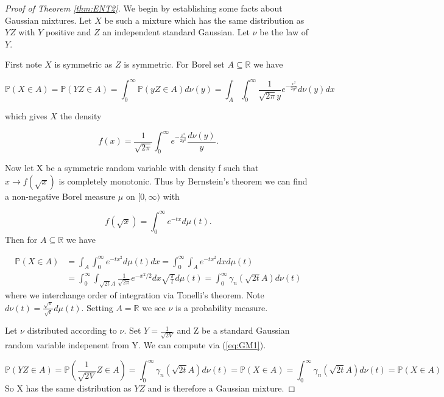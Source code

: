 \documentclass[10pt]{article}
\newcommand{\Pp}{\mathbb{P}}
\newcommand{\1}{\textbf{1}}
\newcommand{\R}{\mathbb{R}}
\theoremstyle{remark}
\theoremstyle{definition}
\begin{document}
\begin{proof}[Proof of Theorem \ref{thm:ENT2}]

We begin by establishing some facts about Gaussian mixtures. Let $X$ be such a mixture which has the same distribution as $YZ$ with $Y$ positive and $Z$ an independent standard Gaussian. Let $\nu$ be the law of $Y$. 

First note $X$ is symmetric as $Z$ is symmetric. For Borel set $A \subseteq \R$ we have

\begin{equation}\label{eq:test}
	\Pp(X \in A) = \Pp(YZ \in A) = \int_0^{\infty}\Pp(yZ \in A)d\nu(y) = \int_A \int_0^{\infty}\frac{1}{\sqrt{2\pi}y}e^{-\frac{x^2}{2y^2}}d\nu(y)dx
\end{equation}

which gives $X$ the density

\begin{equation}\label{eq:GM2}
	f(x) = \frac{1}{\sqrt{2\pi}}\int_0^{\infty}e^{-\frac{x^2}{2y^2}}\frac{d\nu(y)}{y}.
\end{equation}

Now let X be a symmetric random variable with density f such that $x \to f(\sqrt{x})$ is completely monotonic. Thus by Bernstein's theorem we can find a non-negative Borel measure $\mu$ on $[0,\infty)$ with

\begin{equation}
	f(\sqrt{x}) = \int_0^{\infty}e^{-tx}d\mu(t).
\end{equation} Then for $A \subseteq \R$ we have

\begin{align}\label{eq:GM1}
	\Pp(X \in A) &= \int_A \int_0^{\infty} e^{-tx^2}d\mu(t)dx = \int_0^{\infty}\int_A e^{-tx^2}dxd\mu(t)\\
	&= \int_0^{\infty} \int_{\sqrt{2t}A} \frac{1}{\sqrt{2\pi}} e^{-x^2/2}dx\sqrt{\frac{\pi}{t}}d\mu(t) = \int_0^{\infty} \gamma_n(\sqrt{2t}A)d\nu(t)
\end{align} where we interchange order of integration via Tonelli's theorem. Note $d\nu(t) = \frac{\sqrt{\pi}}{\sqrt{t}} d\mu(t)$. Setting $A = \R$ we see $\nu$ is a probability measure.

Let $\nu$ distributed according to $\nu$. Set $Y = \frac{1}{\sqrt{2V}}$ and Z be a standard Gaussian random variable indepenent from Y. We can compute via (\ref{eq:GM1}). 

\begin{equation*}
	\Pp(YZ \in A) = \Pp(\frac{1}{\sqrt{2V}}Z \in A) = \int_0^{\infty} \gamma_n(\sqrt{2t}A) d\nu(t) = \Pp(X \in A) = \int_0^{\infty} \gamma_n(\sqrt{2t}A) d\nu(t) = \Pp(X \in A)
\end{equation*} So X has the same distribution as $YZ$ and is therefore a Gaussian mixture.


\end{proof}
\end{document}

